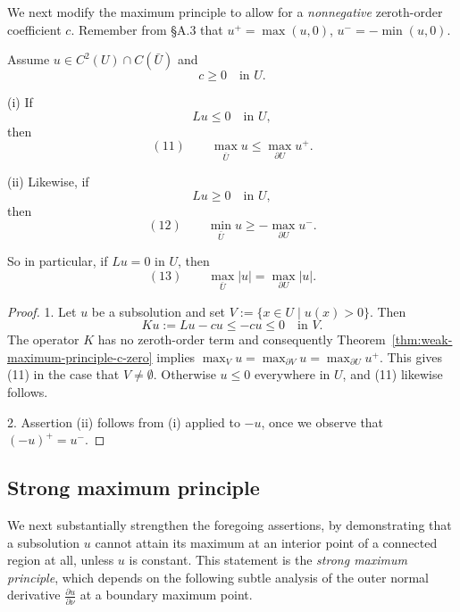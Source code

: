 We next modify the maximum principle to allow for a \textit{nonnegative} zeroth-order coefficient $c$. Remember from \S A.3 that $u^+ = \max(u,0)$, $u^- = -\min(u,0)$.

\begin{theorem}
\label{thm:weak-maximum-principle-c-nonneg}
Assume $u \in C^2(U) \cap C(\bar U)$ and
$$c \geq 0 \quad \text{in } U.$$

(i) If
$$Lu \leq 0 \quad \text{in } U,$$
then
$$(11) \qquad \max_{\bar U} u \leq \max_{\partial U} u^+.$$

(ii) Likewise, if
$$Lu \geq 0 \quad \text{in } U,$$
then
$$(12) \qquad \min_{\bar U} u \geq -\max_{\partial U} u^-.$$
\end{theorem}

\begin{remark}
\label{rem:weak-maximum-principle-absolute-value}
So in particular, if $Lu = 0$ in $U$, then
$$(13) \qquad \max_{\bar U}|u| = \max_{\partial U}|u|.$$
\end{remark}

\begin{proof}
1. Let $u$ be a subsolution and set $V := \{x \in U \mid u(x) > 0\}$. Then
$$Ku := Lu - cu \leq -cu \leq 0 \quad \text{in } V.$$
The operator $K$ has no zeroth-order term and consequently Theorem~\ref{thm:weak-maximum-principle-c-zero} implies $\max_V u = \max_{\partial V} u = \max_{\partial U} u^+$. This gives (11) in the case that $V \neq \emptyset$. Otherwise $u \leq 0$ everywhere in $U$, and (11) likewise follows.

2. Assertion (ii) follows from (i) applied to $-u$, once we observe that $(-u)^+ = u^-$.
\end{proof}

\subsection{Strong maximum principle}

We next substantially strengthen the foregoing assertions, by demonstrating that a subsolution $u$ cannot attain its maximum at an interior point of a connected region at all, unless $u$ is constant. This statement is the \textit{strong maximum principle}, which depends on the following subtle analysis of the outer normal derivative $\frac{\partial u}{\partial\nu}$ at a boundary maximum point.

